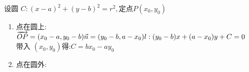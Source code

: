 \documentclass[class=ctexart,crop=false]{standalone}
\begin{document}
设圆 $C:(x-a)^2+(y-b)^2=r^2,\text{定点}P(x_0,y_0)$
\begin{enumerate}[label=(\arabic*)]
    \item 点在圆上:\\
          $\overrightarrow{OP}=(x_0-a,y_0-b)\\
              \vec{n}=(y_0-b,a-x_0)\\
              l:(y_0-b)x+(a-x_0)y+C=0$\\
          带入 $(x_0,y_0)$得:$C=bx_0-ay_0$\\
    \item 点在圆外:
\end{enumerate}
\end{document}
